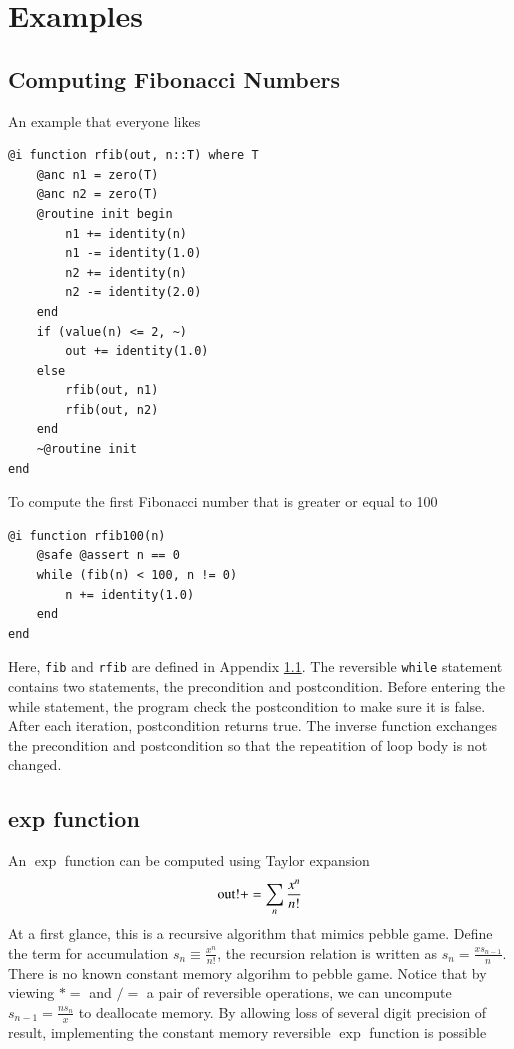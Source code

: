 \documentclass[aps,twocolumn,longbibliography,english,superscriptaddress,prr]{revtex4-1}
\newcommand{\<}{\langle}
\renewcommand{\>}{\rangle}
\newcommand{\App}[1]{Appendix \ref{#1}}
\theoremstyle{definition}\newtheorem{definition}{\textit{Definition}}
\begin{document}
\section{Examples}\label{sec:example}

\subsection{Computing Fibonacci Numbers}\label{sec:fib}
An example that everyone likes

\begin{minipage}{.44\textwidth}
\begin{lstlisting}
@i function rfib(out, n::T) where T
    @anc n1 = zero(T)
    @anc n2 = zero(T)
    @routine init begin
        n1 += identity(n)
        n1 -= identity(1.0)
        n2 += identity(n)
        n2 -= identity(2.0)
    end
    if (value(n) <= 2, ~)
        out += identity(1.0)
    else
        rfib(out, n1)
        rfib(out, n2)
    end
    ~@routine init
end
\end{lstlisting}
\end{minipage}

To compute the first Fibonacci number that is greater or equal to 100

\begin{minipage}{.44\textwidth}
\begin{lstlisting}
@i function rfib100(n)
    @safe @assert n == 0
    while (fib(n) < 100, n != 0)
        n += identity(1.0)
    end
end
\end{lstlisting}
\end{minipage}

Here, \texttt{fib} and \texttt{rfib} are defined in \App{sec:fib}.
The reversible \texttt{while} statement contains two statements, the precondition and postcondition.
Before entering the while statement, the program check the postcondition to make sure it is false.
After each iteration, postcondition returns true. The inverse function exchanges the precondition and postcondition so that the repeatition of loop body is not changed.

\subsection{exp function}\label{sec:exp}
An $\exp$ function can be computed using Taylor expansion
\begin{equation}
    {\rm out!} += \sum\limits_n \frac{x^n}{n!}
\end{equation}
At a first glance, this is a recursive algorithm that mimics pebble game.
Define the term for accumulation $s_n \equiv \frac{x^n}{n!}$, the recursion relation is written as $s_n = \frac{x s_{n-1}}{n}$.
There is no known constant memory algorihm to pebble game.
Notice that by viewing $*=$ and $/=$ a pair of reversible operations, we can uncompute $s_{n-1} = \frac{n s_n}{x}$ to deallocate memory.
By allowing loss of several digit precision of result, implementing the constant memory reversible $\exp$ function is possible
\end{document}
